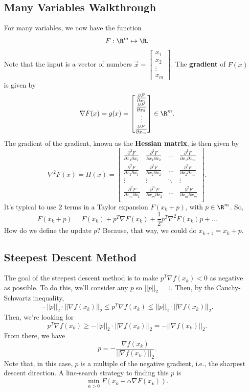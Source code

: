\documentclass[letterpaper]{article}
\begin{document}
\subsection{Many Variables Walkthrough}
For many variables, we now have the function \[F: \R^m \mapsto \R.\] Note that the input is a vector of numbers $\vec{x} = \begin{bmatrix}
    x_1 \\ x_2 \\ \vdots \\ x_m
\end{bmatrix}$. The \textbf{gradient} of $F(x)$ is given by 
\[\nabla F(x) = g(x) = \begin{bmatrix}
    \frac{\partial F}{\partial x_1} \\ 
    \frac{\partial F}{\partial x_2} \\ 
    \vdots \\ 
    \frac{\partial F}{\partial x_m}
\end{bmatrix} \in \R^m.\] The gradient of the gradient, known as the \textbf{Hessian matrix}, is then given by 
\[\nabla^2 F(x) = H(x) = \begin{bmatrix}
    \frac{\partial^2 F}{\partial x_1 \partial x_1} & \frac{\partial^2 F}{\partial x_1 \partial x_2} & \hdots & \frac{\partial^2 F}{\partial x_1 \partial x_m} \\ 
    \frac{\partial^2 F}{\partial x_2 \partial x_1} & \frac{\partial^2 F}{\partial x_2 \partial x_2} & \hdots & \frac{\partial^2 F}{\partial x_2 \partial x_m} \\ 
    \vdots & \vdots & \ddots & \vdots \\ 
    \frac{\partial^2 F}{\partial x_m \partial x_1} & \frac{\partial^m F}{\partial x_m \partial x_2} & \hdots & \frac{\partial^2 F}{\partial x_m \partial x_m}\\ 
\end{bmatrix}.\]
It's typical to use 2 terms in a Taylor expansion $F(x_{k} + p)$, with $p \in \R^m$. So, \[F(x_k + p) = F(x_k) + p^T \nabla F(x_k) + \frac{1}{2} p^T \nabla^2 F(x_k) p + \hdots\]
How do we define the update $p$? Because, that way, we could do $x_{k + 1} = x_{k} + p$.

\subsection{Steepest Descent Method}
The goal of the steepest descent method is to make $p^T \nabla f(x_k) < 0$ as negative as possible. To do this, we'll consider any $p$ so $||p||_2 = 1.$ Then, by the Cauchy-Schwartz inequality, \[-||p||_2 \cdot ||\nabla f(x_k)||_2 \leq  p^T \nabla f(x_k) \leq ||p||_2 \cdot ||\nabla f(x_k)||_2.\]
Then, we're looking for 
\[p^T \nabla f(x_k) \geq -||p||_2 \cdot ||\nabla f(x_k)||_2 = -||\nabla f(x_k)||_2.\] From there, we have \[p = -\frac{\nabla f(x_k)}{||\nabla f(x_k)||_2}.\] Note that, in this case, $p$ is a multiple of the negative gradient, i.e., the sharpest descent direction. A line-search strategy to finding this $p$ is 
\[\min_{\alpha > 0} F(x_k - \alpha \nabla F(x_k)).\]
\end{document}
